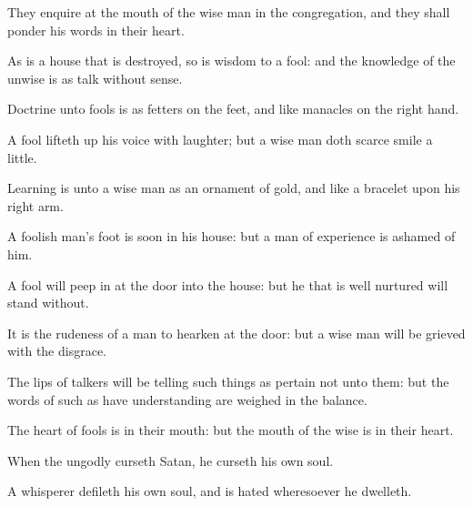 {\par }{\PP {}They enquire at the mouth of the wise man in the congregation, and they shall ponder his words in their heart.
\par }{\PP {}As is a house that is destroyed, so is wisdom to a fool: and the knowledge of the unwise is as talk without sense.
\par }{\PP {}Doctrine unto fools is as fetters on the feet, and like manacles on the right hand.
\par }{\PP {}A fool lifteth up his voice with laughter; but a wise man doth scarce smile a little.
\par }{\PP {}Learning is unto a wise man as an ornament of gold, and like a bracelet upon his right arm.
\par }{\PP {}A foolish man’s foot is soon in his
{} house: but a man of experience is ashamed of him.
\par }{\PP {}A fool will peep in at the door into the house: but he that is well nurtured will stand without.
\par }{\PP {}It is the rudeness of a man to hearken at the door: but a wise man will be grieved with the disgrace.
\par }{\PP {}The lips of talkers will be telling such things as pertain not unto them: but the words of such as have understanding are weighed in the balance.
\par }{\PP {}The heart of fools is in their mouth: but the mouth of the wise is in their heart.
\par }{\PP {}When the ungodly curseth Satan, he curseth his own soul.
\par }{\PP {}A whisperer defileth his own soul, and is hated wheresoever he dwelleth.

}
